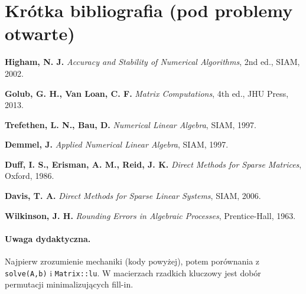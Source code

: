 \documentclass[12pt]{article}
\begin{document}
\section*{Krótka bibliografia (pod problemy otwarte)}
\begin{enumerate}[label={[\arabic*]}]
\item \textbf{Higham, N. J.} \emph{Accuracy and Stability of Numerical Algorithms}, 2nd ed., SIAM, 2002.
\item \textbf{Golub, G. H., Van Loan, C. F.} \emph{Matrix Computations}, 4th ed., JHU Press, 2013.
\item \textbf{Trefethen, L. N., Bau, D.} \emph{Numerical Linear Algebra}, SIAM, 1997.
\item \textbf{Demmel, J.} \emph{Applied Numerical Linear Algebra}, SIAM, 1997.
\item \textbf{Duff, I. S., Erisman, A. M., Reid, J. K.} \emph{Direct Methods for Sparse Matrices}, Oxford, 1986.
\item \textbf{Davis, T. A.} \emph{Direct Methods for Sparse Linear Systems}, SIAM, 2006.
\item \textbf{Wilkinson, J. H.} \emph{Rounding Errors in Algebraic Processes}, Prentice-Hall, 1963.
\end{enumerate}

\paragraph{Uwaga dydaktyczna.}
Najpierw zrozumienie mechaniki (kody powyżej), potem porównania z \texttt{solve(A,b)} i \texttt{Matrix::lu}.
W macierzach rzadkich kluczowy jest dobór permutacji minimalizujących fill-in.
\end{document}
